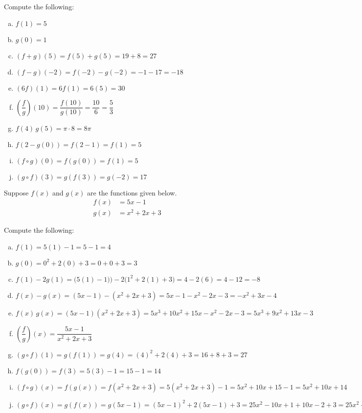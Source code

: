\documentclass[11pt,letterpaper]{article}
\begin{document}
Compute the following: \pspace
        \begin{enumerate}[(a)]
        \item $f(1)= 5$ \vfill
        \item $g(0)= 1$ \vfill
        \item $(f + g)(5)= f(5) + g(5)= 19 + 8= 27$ \vfill
        \item $(f - g)(-2)= f(-2) - g(-2)= -1 - 17= -18$ \vfill
        \item $(6f)(1)= 6f(1)= 6(5)= 30$ \vfill
        \item $\left(\dfrac{f}{g}\right)(10)= \dfrac{f(10)}{g(10)}= \dfrac{10}{6}= \dfrac{5}{3}$ \vfill
        \item $f(4)\, g(5)= \pi \cdot 8= 8\pi$ \vfill
        \item $f(2 - g(0))= f(2 - 1)= f(1)= 5$ \vfill
        \item $(f \circ g)(0)= f(g(0))= f(1)= 5$ \vfill
        \item $(g \circ f)(3)= g(f(3))= g(-2)= 17$ \vfill
        \end{enumerate}





\newpage





 Suppose $f(x)$ and $g(x)$ are the functions given below. 
	\[
	\begin{aligned}
	f(x)&= 5x - 1 \\[0.3cm]
	g(x)&= x^2 + 2x + 3
	\end{aligned}
	\]

Compute the following: \pspace
\begin{enumerate}[(a)]
\item $f(1)= 5(1) - 1= 5 - 1= 4$ \vfill
\item $g(0)= 0^2 + 2(0) + 3= 0 + 0 + 3= 3$ \vfill
\item $f(1) - 2g(1)= \big( 5(1) - 1) \big) - 2 \big(1^2 + 2(1) + 3 \big)= 4 - 2(6)= 4 - 12= -8$ \vfill
\item $f(x) - g(x)= (5x - 1) - (x^2 + 2x + 3)= 5x - 1 - x^2 - 2x - 3= -x^2 + 3x - 4$ \vfill
\item $f(x) \, g(x)= (5x - 1)(x^2 + 2x + 3)= 5x^3 + 10x^2 + 15x - x^2 - 2x - 3= 5x^3 + 9x^2 + 13x - 3$ \vfill
\item $\left( \dfrac{f}{g} \right)(x)= \dfrac{5x - 1}{x^2 + 2x + 3}$ \vfill
\item $(g \circ f)(1)= g(f(1))= g(4)= (4)^2 + 2(4) + 3= 16 + 8 + 3= 27$ \vfill
\item $f(g(0))= f(3)= 5(3) - 1= 15 - 1= 14$ \vfill
\item $(f \circ g)(x)= f(g(x))= f(x^2 + 2x + 3)= 5(x^2 + 2x + 3) - 1= 5x^2 + 10x + 15 - 1= 5x^2 + 10x + 14$ \vfill
\item $(g \circ f)(x)= g(f(x))= g(5x - 1)= (5x - 1)^2 + 2(5x - 1) + 3= 25x^2 - 10x + 1 + 10x - 2 + 3= 25x^2 + 2$ \vfill
\end{enumerate}


\end{document}
